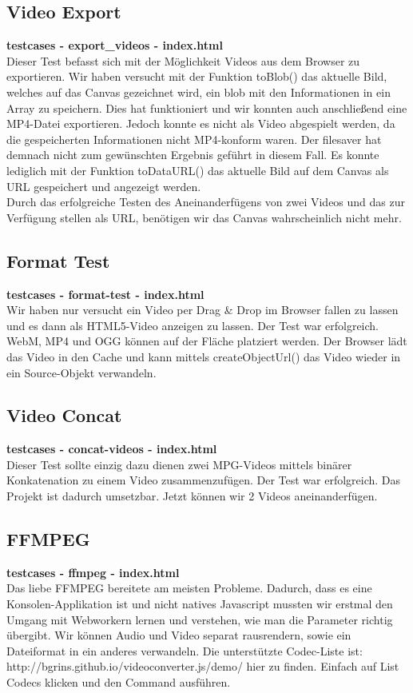 \documentclass[a4paper,10pt]{scrartcl}
\begin{document}
\subsection{Video Export}
\textbf{testcases - export\_videos - index.html} \\
Dieser Test befasst sich mit der Möglichkeit Videos aus dem Browser zu exportieren. Wir haben versucht mit der Funktion toBlob() das aktuelle Bild, welches auf das Canvas gezeichnet wird, ein blob mit den Informationen in ein Array zu speichern. Dies hat funktioniert und wir konnten auch anschließend eine MP4-Datei exportieren. Jedoch konnte es nicht als Video abgespielt werden, da die gespeicherten Informationen nicht MP4-konform waren. Der filesaver hat demnach nicht zum gewünschten Ergebnis geführt in diesem Fall. Es konnte lediglich mit der Funktion toDataURL() das aktuelle Bild auf dem Canvas als URL gespeichert und angezeigt werden. \\
Durch das erfolgreiche Testen des Aneinanderfügens von zwei Videos und das zur Verfügung stellen als URL, benötigen wir das Canvas wahrscheinlich nicht mehr.
\subsection{Format Test}
\textbf{testcases - format-test - index.html} \\
Wir haben nur versucht ein Video per Drag \& Drop im Browser fallen zu lassen und es dann als HTML5-Video anzeigen zu lassen. Der Test war erfolgreich. WebM, MP4 und OGG können auf der Fläche platziert werden. Der Browser lädt das Video in den Cache und kann mittels createObjectUrl() das Video wieder in ein Source-Objekt verwandeln.
\newpage
\subsection{Video Concat}
\textbf{testcases - concat-videos - index.html} \\
Dieser Test sollte einzig dazu dienen zwei MPG-Videos mittels binärer Konkatenation zu einem Video zusammenzufügen. Der Test war erfolgreich. Das Projekt ist dadurch umsetzbar. Jetzt können wir 2 Videos aneinanderfügen. 
\subsection{FFMPEG}
\textbf{testcases - ffmpeg - index.html} \\
Das liebe FFMPEG bereitete am meisten Probleme. Dadurch, dass es eine Konsolen-Applikation ist und nicht natives Javascript mussten wir erstmal den Umgang mit Webworkern lernen und verstehen, wie man die Parameter richtig übergibt. Wir können Audio und Video separat rausrendern, sowie ein Dateiformat in ein anderes verwandeln. Die unterstützte Codec-Liste ist: http://bgrins.github.io/videoconverter.js/demo/ hier zu finden. Einfach auf List Codecs klicken und den Command ausführen.
\newpage
\end{document}
